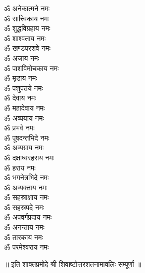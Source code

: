 \begin{multicols}{2}
\begin{flushleft}
ॐ अनेकात्मने नमः\\
ॐ सात्त्विकाय नमः\\
ॐ शुद्धविग्रहाय नमः\\
ॐ शाश्वताय नमः\\
ॐ खण्डपरशवे नमः\\
ॐ अजाय  नमः\\
ॐ पाशविमोचकाय नमः\hfill{}\\
ॐ मृडाय नमः\\
ॐ पशुपतये नमः\\
ॐ देवाय नमः\\
ॐ महादेवाय नमः\\
ॐ अव्ययाय नमः\\
ॐ प्रभवे नमः\\
ॐ पूषदन्तभिदे नमः\\
ॐ अव्यग्राय नमः\\
ॐ दक्षाध्वरहराय नमः\\
ॐ हराय नमः\hfill{}\\
ॐ भगनेत्रभिदे नमः\\
ॐ अव्यक्ताय नमः\\
ॐ सहस्राक्षाय नमः\\
ॐ सहस्रपदे नमः\\
ॐ अपवर्गप्रदाय नमः\\
ॐ अनन्ताय नमः\\
ॐ तारकाय नमः\\
ॐ परमेश्वराय नमः\\
\end{flushleft}
\end{multicols}
\centerline{॥ इति शाक्तप्रमोदे श्री शिवाष्टोत्तरशतनामावलिः सम्पूर्णा ॥}
